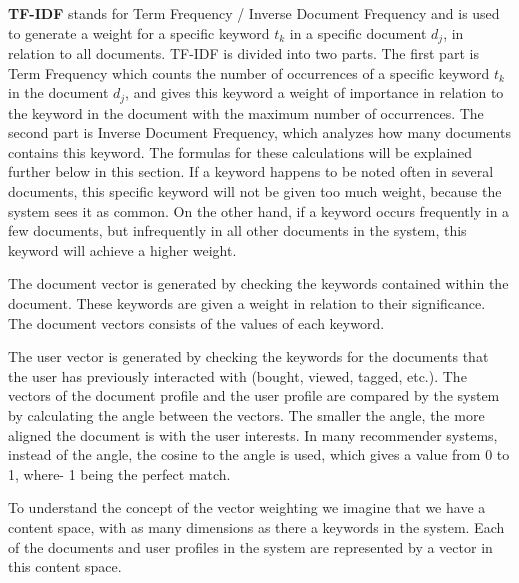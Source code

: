 \textbf{TF-IDF} stands for Term Frequency / Inverse Document Frequency and is used to generate a weight for a specific keyword \(t_{k}\) in a specific document \(d_{j}\), in relation to all documents. TF-IDF is divided into two parts.\newline
The first part is Term Frequency which counts the number of occurrences of a specific keyword \(t_{k}\) in the document \(d_{j}\), and gives this keyword a weight of importance in relation to the keyword in the document with the maximum number of occurrences. %
The second part is Inverse Document Frequency, which analyzes how many documents contains this keyword. The formulas for these calculations will be explained further below in this section. \newline
If a keyword happens to be noted often in several documents, this specific keyword will not be given too much weight, because the system sees it as common. On the other hand, if a keyword occurs frequently in a few documents, but infrequently in all other documents in the system, this keyword will achieve a higher weight.\newline

The document vector is generated by checking the keywords contained within the document. These keywords are given a weight in relation to their significance. The document vectors consists of the values of each keyword. 

The user vector is generated by checking the keywords for the documents that the user has previously interacted with (bought, viewed, tagged, etc.).\newline
The vectors of the document profile and the user profile are compared by the system by calculating the angle between the vectors. The smaller the angle, the more aligned the document is with the user interests. In many recommender systems, instead of the angle, the cosine to the angle is used, which gives a value from 0 to 1, where- 1 being the perfect match.\newline

To understand the concept of the vector weighting we imagine that we have a content space, with as many dimensions as there a keywords in the system. Each of the documents and user profiles in the system are represented by a vector in this content space.\newline


